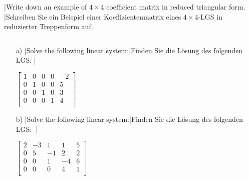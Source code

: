 \begin{center}
\end{center}

\begin{exer}
\tr|Write down an example of $4\times 4$ coefficient matrix in reduced triangular form. |Schreiben Sie ein Beispiel einer Koeffizientenmatrix eines $4\times 4$-LGS in reduzierter Treppenform auf.|
\end{exer}
\vspace{4cm}

\newpage

\begin{exer}
$ $

\begin{itemize}
\item[a)] \tr|Solve the following linear system:|Finden Sie die Lösung des folgenden LGS: |

$
\left[\begin{array}{rrrr|r}
1&0&0&0&-2\\
0&1&0&0&5\\
0&0&1&0&3\\
0&0&0&1&4\\
\end{array}\right]
$
\vsp\vsp\vsp

\item[b)]	\tr|Solve the following linear system:|Finden Sie die Lösung des folgenden LGS: |

$
\left[\begin{array}{rrrr|r}
2&-3&1&1&5\\
0&5&-1&2&2\\
0&0&1&-4&6\\
0&0&0&4&1\\
\end{array}\right]
$
\end{itemize}
\end{exer}
\vsp\vsp\vsp



